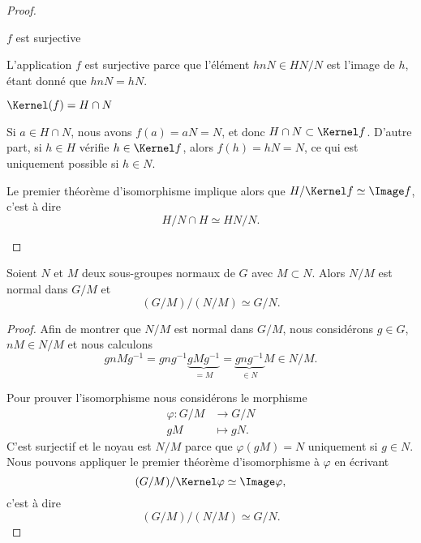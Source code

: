 \begin{proof}
\begin{enumerate}
            \begin{subproof}
                \item[\( f\) est surjective]
                
                    L'application \( f\) est surjective parce que l'élément \( hnN\in HN/N\) est l'image de \( h\), étant donné que \( hnN=hN\).

                \item[\( \Kernel(f)=H\cap N\)]

            Si \( a\in H\cap N\), nous avons \( f(a) =aN = N\), et donc \( H\cap N\subset \Kernel f\). D'autre part, si \( h\in H\) vérifie \( h\in\Kernel f\), alors \( f(h)=hN=N\), ce qui est uniquement possible si \( h\in N\).

            \end{subproof}
            Le premier théorème d'isomorphisme implique alors que \( H/\Kernel f\simeq \Image f\), c'est à dire
            \begin{equation}
                H/N\cap H\simeq HN/N.
            \end{equation}
    \end{enumerate}
\end{proof}

\begin{theorem}  \label{ThoezgBep}
    Soient \( N\) et \( M\) deux sous-groupes normaux de \( G\) avec \( M\subset N\). Alors \( N/M\) est normal dans \( G/M\) et
    \begin{equation}
        (G/M)/(N/M)\simeq G/N.
    \end{equation}
\end{theorem}

\begin{proof}
    Afin de montrer que \( N/M\) est normal dans \( G/M\), nous considérons \( g\in G\), \( nM\in N/M\) et nous calculons
    \begin{equation}
        gnMg^{-1}=gng^{-1}\underbrace{gMg^{-1}}_{=M}=\underbrace{gng^{-1}}_{\in N}M\in N/M.
    \end{equation}

    Pour prouver l'isomorphisme nous considérons le morphisme
    \begin{equation}
        \begin{aligned}
            \varphi\colon G/M&\to G/N \\
            gM&\mapsto gN. 
        \end{aligned}
    \end{equation}
    C'est surjectif et le noyau est \( N/M\) parce que \( \varphi(gM)=N\) uniquement si \( g\in N\). Nous pouvons appliquer le premier théorème d'isomorphisme à \( \varphi\) en écrivant
    \begin{equation}
        (G/M)/\Kernel \varphi\simeq\Image \varphi,
    \end{equation}
    c'est à dire
    \begin{equation}
        (G/M)/(N/M)\simeq G/N.
    \end{equation}
\end{proof}

